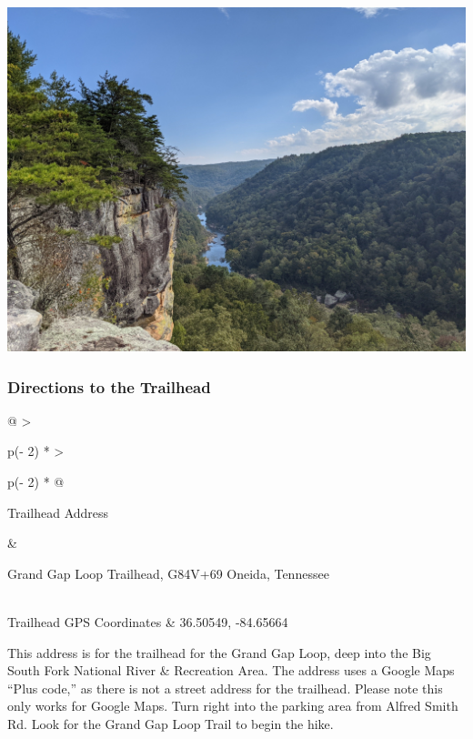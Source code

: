 \documentclass[
  letterpaper,
  DIV=11,
  numbers=noendperiod]{scrartcl}
\begin{document}
\includegraphics{img/trail-18-figure-01.jpg}

\hypertarget{directions-to-the-trailhead-17}{%
\subsubsection{Directions to the
Trailhead}\label{directions-to-the-trailhead-17}}

\begin{longtable}[]{@{}
  >{\raggedright\arraybackslash}p{(\columnwidth - 2\tabcolsep) * }
  >{\raggedright\arraybackslash}p{(\columnwidth - 2\tabcolsep) * }@{}}
\toprule\noalign{}
\begin{minipage}[b]{\linewidth}\raggedright
Trailhead Address
\end{minipage} & \begin{minipage}[b]{\linewidth}\raggedright
Grand Gap Loop Trailhead, G84V+69 Oneida, Tennessee
\end{minipage} \\
\midrule\noalign{}
\endhead
\bottomrule\noalign{}
\endlastfoot
Trailhead GPS Coordinates & 36.50549, -84.65664 \\
\end{longtable}

This address is for the trailhead for the Grand Gap Loop, deep into the
Big South Fork National River \& Recreation Area. The address uses a
Google Maps ``Plus code,'' as there is not a street address for the
trailhead. Please note this only works for Google Maps. Turn right into
the parking area from Alfred Smith Rd. Look for the Grand Gap Loop Trail
to begin the hike.
\end{document}
